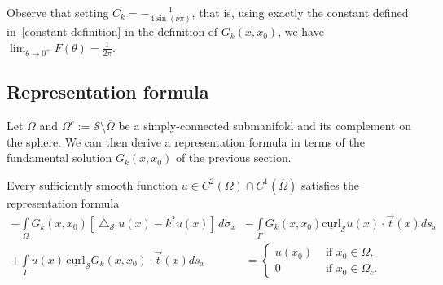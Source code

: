 \documentclass[final]{siamltex}
\newcommand{\lap}{\bigtriangleup}
\newcommand{\C}{C_k}
\renewcommand{\S} {\mathcal{S}}
\begin{document}
Observe that setting $\C=-\frac{1}{4\sin(\nu \pi)}$, that is, using
exactly the constant defined in~\eqref{constant-definition} in the
definition of $G_k(x,x_0)$, we have $\lim_{\theta\rightarrow
0^+}F(\theta)=\frac{1}{2\pi}.$




\subsection{Representation formula}
\label{s:representation}
Let $\Omega$ and $\Omega^{c}:=\S\setminus{\overline{\Omega}}$ be a
simply-connected submanifold and its complement on the sphere. We can
then derive a representation formula in terms of the fundamental
solution
$G_k(x,x_{0})$ of the previous section.
\begin{proposition}
\label{prop:repr}
Every sufficiently smooth function $u \in C^{2}(\Omega) \cap
C^{1}(\overline{\Omega})$ satisfies the representation formula
\begin{align} 
\label{eq:representationformula}
 - \int\limits_{\Omega} 
    G_k(x,x_{0})\left[\lap_{\S}u(x) -k^2 u(x)\right]\,d\sigma_x 
 &- \int\limits_{{\Gamma}} G_k(x,x_{0})  
    \underline{\mbox{curl}}_{\S} u(x) \cdot \vec{t}(x) ds_x \nonumber \\
 + \int\limits_{{\Gamma}}  u(x)
 \,\underline{\mbox{curl}}_{{\S}} G_k(x,x_0) \cdot \vec{t}(x) ds_x 
 &= \left\{ \begin{array}{ll} u(x_0) & \mbox{ if $x_0\in \Omega$},\\
  0 & \mbox{ if  $x_0\in{\Omega}_c$}. 
  \end{array} \right.
\end{align}

\end{proposition}
\end{document}
